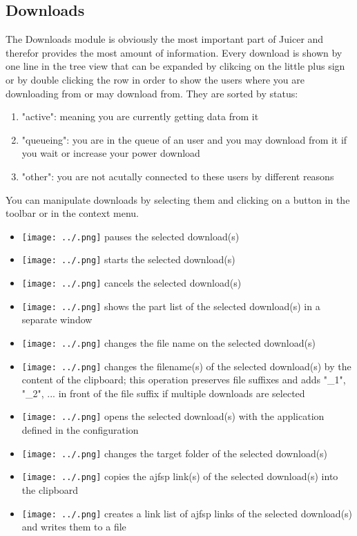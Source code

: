\documentclass[a4paper,10pt]{book}
\begin{document}
\subsection{Downloads}
\label{sec:downloads}
The Downloads module is obviously the most important part of Juicer and therefor provides the most amount of information.
Every download is shown by one line in the tree view that can be expanded by clikcing on the little plus sign or by double clicking
the row in order to show the users where you are downloading from or may download from. They are sorted by status:
\begin{enumerate}
 \item "active": meaning you are currently getting data from it
 \item "queueing": you are in the queue of an user and you may download from it if you wait or increase your power download
 \item "other": you are not acutally connected to these users by different reasons
\end{enumerate}
You can manipulate downloads by selecting them and clicking on a button in the toolbar or in the context menu.
\begin{itemize}
 \item \texttt{[image: ../.png]} pauses the selected download(s)
 \item \texttt{[image: ../.png]} starts the selected download(s)
 \item \texttt{[image: ../.png]} cancels the selected download(s)
 \item \texttt{[image: ../.png]} shows the part list of the selected download(s) in a separate window
 \item \texttt{[image: ../.png]} changes the file name on the selected download(s)
 \item \texttt{[image: ../.png]} changes the filename(s) of the selected download(s) by the content of the clipboard; this operation preserves file suffixes and adds "_1", "_2", ... in front of the file suffix if multiple downloads are selected
 \item \texttt{[image: ../.png]} opens the selected download(s) with the application defined in the configuration
 \item \texttt{[image: ../.png]} changes the target folder of the selected download(s)
 \item \texttt{[image: ../.png]} copies the ajfsp link(s) of the selected download(s) into the clipboard
 \item \texttt{[image: ../.png]} creates a link list of ajfsp links of the selected download(s) and writes them to a file
\end{itemize}
\end{document}
